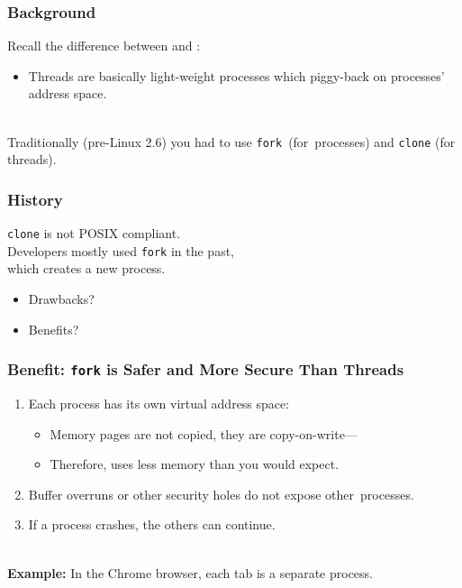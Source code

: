 \begin{frame}[fragile]
  \frametitle{Background}


  Recall the difference between  and 
          :
  \begin{itemize}
    \item Threads are basically light-weight processes which piggy-back on
          processes' address space.
  \end{itemize} ~\\
  Traditionally (pre-Linux 2.6) you had to use {\tt fork}~(for~processes) and {\tt clone} (for threads).


\end{frame}

\begin{frame}[fragile]
  \frametitle{History}


    {\tt clone} is not POSIX compliant.
    ~\\
    Developers mostly used {\tt fork} in the past, \\ which creates a new process.
      \begin{itemize}
        \item Drawbacks?
        \item Benefits?
      \end{itemize}

\end{frame}

\begin{frame}[fragile]
  \frametitle{Benefit: {\tt fork} is Safer and More Secure Than Threads}

  \begin{enumerate}
    \item Each process has its own virtual address space:
      \begin{itemize}
        \item Memory pages are not copied, they are copy-on-write---
        \item Therefore, uses less memory than you would expect.
      \end{itemize}
    \item Buffer overruns or other security holes do not expose other~processes.
    \item If a process crashes, the others can continue.
  \end{enumerate}~\\[1em]
  {\bf Example:} In the Chrome browser, each tab is a separate process.
\end{frame}

